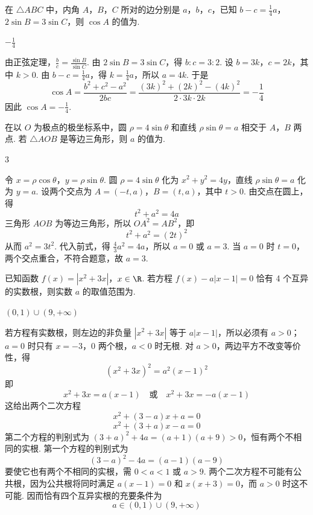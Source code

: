 \begin{problem}
在 \(\triangle ABC\) 中，内角 \(A\)，\(B\)，\(C\) 所对的边分别是 \(a\)，\(b\)，\(c\)，已知 \(b - c = \frac{1}{4}a\)，\(2\sin B = 3\sin C\)，则 \(\cos A\) 的值为\fillinblank{}.
\end{problem}

\begin{answer}
\(-\frac{1}{4}\)
\end{answer}

\begin{solution}
由正弦定理，\(\frac bc=\frac{\sin B}{\sin C}\). 由 \(2\sin B=3\sin C\)，得 \(b:c=3:2\). 设 \(b=3k\)，\(c=2k\)，其中 \(k>0\). 由 \(b-c=\frac14a\)，得 \(k=\frac14a\)，所以 \(a=4k\). 于是
\[
\cos A=\frac{b^2+c^2-a^2}{2bc}=\frac{(3k)^2+(2k)^2-(4k)^2}{2\cdot3k\cdot2k}=-\frac14
\]
因此 \(\cos A=-\frac14\).
\end{solution}

\begin{problem}
在以 \(O\) 为极点的极坐标系中，圆 \(\rho = 4 \sin \theta\) 和直线 \(\rho \sin \theta = a\) 相交于 \(A\)，\(B\) 两点. 若 \(\triangle AOB\) 是等边三角形，则 \(a\) 的值为\fillinblank{}.
\end{problem}

\begin{answer}
\(3\)
\end{answer}

\begin{solution}
令 \(x=\rho\cos\theta\)，\(y=\rho\sin\theta\). 圆 \(\rho=4\sin\theta\) 化为 \(x^2+y^2=4y\)，直线 \(\rho\sin\theta=a\) 化为 \(y=a\). 设两个交点为 \(A=(-t,a)\)，\(B=(t,a)\)，其中 \(t>0\). 由交点在圆上，得
\[
t^2+a^2=4a
\]
三角形 \(AOB\) 为等边三角形，所以 \(OA^2=AB^2\)，即
\[
t^2+a^2=(2t)^2
\]
从而 \(a^2=3t^2\). 代入前式，得 \(\frac43a^2=4a\)，所以 \(a=0\) 或 \(a=3\). 当 \(a=0\) 时 \(t=0\)，两个交点重合，不符合题意，故 \(a=3\).
\end{solution}

\begin{problem}
已知函数 \( f(x) = |x^2 + 3x| \)，\( x \in \R \). 若方程 \( f(x) - a|x - 1| = 0 \) 恰有 4 个互异的实数根，则实数 \( a \) 的取值范围为\fillinblank{}.
\end{problem}

\begin{answer}
\((0,1)\cup(9,+\infty)\)
\end{answer}

\begin{solution}
若方程有实数根，则左边的非负量 \(|x^2+3x|\) 等于 \(a|x-1|\)，所以必须有 \(a>0\)；\(a=0\) 时只有 \(x=-3\)，\(0\) 两个根，\(a<0\) 时无根. 对 \(a>0\)，两边平方不改变等价性，得
\[
(x^2+3x)^2=a^2(x-1)^2
\]
即
\[
x^2+3x=a(x-1)\quad\text{或}\quad x^2+3x=-a(x-1)
\]
这给出两个二次方程
\[
x^2+(3-a)x+a=0
\]
\[
x^2+(3+a)x-a=0
\]
第二个方程的判别式为 \((3+a)^2+4a=(a+1)(a+9)>0\)，恒有两个不相同的实根. 第一个方程的判别式为
\[
(3-a)^2-4a=(a-1)(a-9)
\]
要使它也有两个不相同的实根，需 \(0<a<1\) 或 \(a>9\). 两个二次方程不可能有公共根，因为公共根将同时满足 \(a(x-1)=0\) 和 \(x(x+3)=0\)，而 \(a>0\) 时这不可能. 因而恰有四个互异实根的充要条件为
\[
a\in(0,1)\cup(9,+\infty)
\]
\end{solution}

